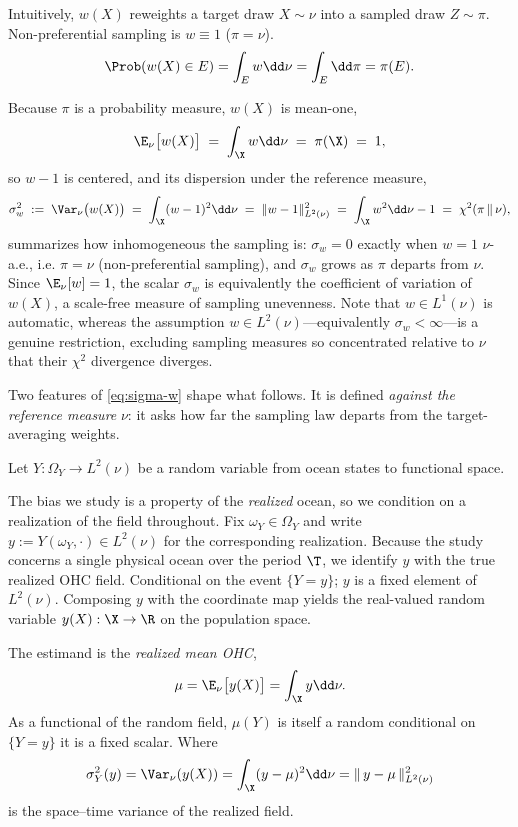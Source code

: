 Intuitively, $w(X)$ reweights a target draw $X\sim\nu$ into a sampled draw $Z\sim\pi$.
Non-preferential sampling is $w\equiv 1$ ($\pi=\nu$).
\[
  \Prob(w(X) \in E) = \int_E w\dd\nu = \int_E \dd\pi = \pi(E).
\]


Because $\pi$ is a probability measure, $w(X)$ is mean-one,
\[
  \E_{\nu}\big[w(X)\big] \;=\; \int_{\X} w \dd\nu \;=\; \pi(\X) \;=\; 1,
\]
so $w-1$ is centered, and its dispersion under the reference measure,
\begin{equation}
  \sigma_w^2 \;:=\; \Var_{\nu}\big(w(X)\big)
  \;=\; \int_{\X} (w-1)^2 \dd\nu
  \;=\; \|w-1\|_{L^2(\nu)}^2
  \;=\; \int_{\X} w^2 \dd\nu - 1
  \;=\; \chi^2(\pi \,\|\, \nu),
  \label{eq:sigma-w}
\end{equation}
summarizes how inhomogeneous the sampling is: $\sigma_w = 0$ exactly when
$w = 1$ $\nu$-a.e., i.e. $\pi = \nu$ (non-preferential sampling), and
$\sigma_w$ grows as $\pi$ departs from $\nu$. Since $\E_\nu[w]=1$, the
scalar $\sigma_w$ is equivalently the coefficient of variation of $w(X)$,
a scale-free measure of sampling unevenness. Note that $w\in L^1(\nu)$ is
automatic, whereas the assumption $w\in L^2(\nu)$---equivalently
$\sigma_w<\infty$---is a genuine restriction, excluding sampling measures
so concentrated relative to $\nu$ that their $\chi^2$ divergence diverges.

Two features of \eqref{eq:sigma-w} shape what follows. It is defined
\emph{against the reference measure} $\nu$: it asks how far the sampling
law departs from the target-averaging weights. 

\begin{definition}
\label{def:Y}
Let $Y: \Omega_Y \to L^2(\nu)$ be a random variable from ocean states to functional space.
\end{definition}

The bias we study is a property of the \emph{realized} ocean, so we condition on a realization of the field throughout.
Fix $\omega_Y\in\Omega_Y$ and write $y := Y(\omega_Y,\cdot)\in L^2(\nu)$ for the corresponding realization.
Because the study concerns a single physical ocean over the period $\T$, we identify $y$ with the true realized OHC field.
Conditional on the event $\{Y = y\}$; $y$ is a fixed element of $L^2(\nu)$.
Composing $y$ with the coordinate map yields the real-valued random variable $y(X): \X \to \R$ on the population space.

\begin{definition}[Estimand]
\label{def:mu}
The estimand is the \emph{realized mean OHC}, 
\[
  \mu = \E_\nu\big[y(X)\big] = \int_\X y \dd\nu.
\]
As a functional of the random field, $\mu(Y)$ is itself a random conditional on $\{Y=y\}$ it is a fixed scalar. 
Where
\[
  \sigma^2_Y(y) = \Var_{\nu}(y(X)) = \int_{\X}(y - \mu)^2\dd\nu = \|\,y - \mu\,\|^2_{L^2(\nu)}
\]
is the space--time variance of the realized field.
\end{definition}

